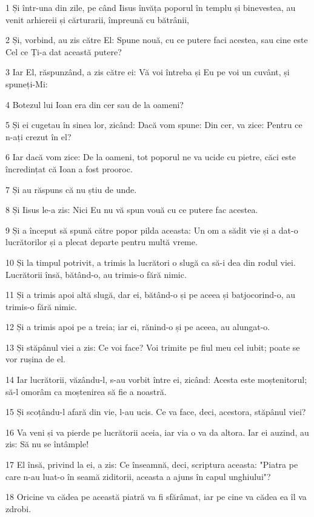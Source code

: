 \par 1 Și într-una din zile, pe când Iisus învăța poporul în templu și binevestea, au venit arhiereii și cărturarii, împreună cu bătrânii,
\par 2 Și, vorbind, au zis către El: Spune nouă, cu ce putere faci acestea, sau cine este Cel ce Ți-a dat această putere?
\par 3 Iar El, răspunzând, a zis către ei: Vă voi întreba și Eu pe voi un cuvânt, și spuneți-Mi:
\par 4 Botezul lui Ioan era din cer sau de la oameni?
\par 5 Și ei cugetau în sinea lor, zicând: Dacă vom spune: Din cer, va zice: Pentru ce n-ați crezut în el?
\par 6 Iar dacă vom zice: De la oameni, tot poporul ne va ucide cu pietre, căci este încredințat că Ioan a fost prooroc.
\par 7 Și au răspuns că nu știu de unde.
\par 8 Și Iisus le-a zis: Nici Eu nu vă spun vouă cu ce putere fac acestea.
\par 9 Și a început să spună către popor pilda aceasta: Un om a sădit vie și a dat-o lucrătorilor și a plecat departe pentru multă vreme.
\par 10 Și la timpul potrivit, a trimis la lucrători o slugă ca să-i dea din rodul viei. Lucrătorii însă, bătând-o, au trimis-o fără nimic.
\par 11 Și a trimis apoi altă slugă, dar ei, bătând-o și pe aceea și batjocorind-o, au trimis-o fără nimic.
\par 12 Și a trimis apoi pe a treia; iar ei, rănind-o și pe aceea, au alungat-o.
\par 13 Și stăpânul viei a zis: Ce voi face? Voi trimite pe fiul meu cel iubit; poate se vor rușina de el.
\par 14 Iar lucrătorii, văzându-l, s-au vorbit între ei, zicând: Acesta este moștenitorul; să-l omorâm ca moștenirea să fie a noastră.
\par 15 Și scoțându-l afară din vie, l-au ucis. Ce va face, deci, acestora, stăpânul viei?
\par 16 Va veni și va pierde pe lucrătorii aceia, iar via o va da altora. Iar ei auzind, au zis: Să nu se întâmple!
\par 17 El însă, privind la ei, a zis: Ce înseamnă, deci, scriptura aceasta: "Piatra pe care n-au luat-o în seamă ziditorii, aceasta a ajuns în capul unghiului"?
\par 18 Oricine va cădea pe această piatră va fi sfărâmat, iar pe cine va cădea ea îl va zdrobi.
